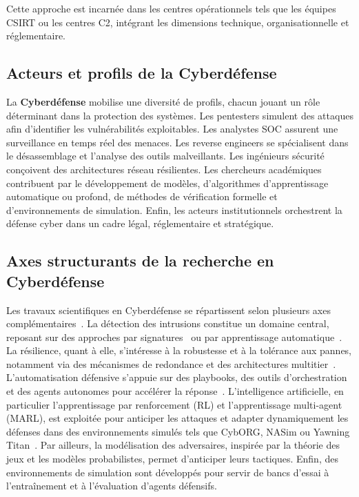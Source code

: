Cette approche est incarnée dans les centres opérationnels tels que les équipes \ac{CSIRT} ou les centres \ac{C2}, intégrant les dimensions technique, organisationnelle et réglementaire.

\subsection*{Acteurs et profils de la Cyberdéfense}

La \textbf{Cyberdéfense} mobilise une diversité de profils, chacun jouant un rôle déterminant dans la protection des systèmes. Les pentesters simulent des attaques afin d'identifier les vulnérabilités exploitables. Les analystes \ac{SOC} assurent une surveillance en temps réel des menaces. Les reverse engineers se spécialisent dans le désassemblage et l'analyse des outils malveillants. Les ingénieurs sécurité conçoivent des architectures réseau résilientes. Les chercheurs académiques contribuent par le développement de modèles, d'algorithmes d'apprentissage automatique ou profond, de méthodes de vérification formelle et d'environnements de simulation. Enfin, les acteurs institutionnels orchestrent la défense cyber dans un cadre légal, réglementaire et stratégique.


\subsection*{Axes structurants de la recherche en Cyberdéfense}

Les travaux scientifiques en Cyberdéfense se répartissent selon plusieurs axes complémentaires~\cite{Buczak2016}. La détection des intrusions constitue un domaine central, reposant sur des approches par signatures~\cite{Axelsson2000} ou par apprentissage automatique~\cite{Sommer2010,Buczak2016}. La résilience, quant à elle, s'intéresse à la robustesse et à la tolérance aux pannes, notamment via des mécanismes de redondance et des architectures multitier~\cite{Bodeau2011}. L'automatisation défensive s'appuie sur des playbooks, des outils d'orchestration et des agents autonomes pour accélérer la réponse~\cite{Hazra2022}. L'intelligence artificielle, en particulier l'apprentissage par renforcement (\ac{RL}) et l'apprentissage multi-agent (\ac{MARL}), est exploitée pour anticiper les attaques et adapter dynamiquement les défenses dans des environnements simulés tels que CybORG, NASim ou Yawning Titan~\cite{Standen2021, nasim2023,Andrew2022}. Par ailleurs, la modélisation des adversaires, inspirée par la théorie des jeux et les modèles probabilistes, permet d'anticiper leurs tactiques. Enfin, des environnements de simulation sont développés pour servir de bancs d'essai à l'entraînement et à l'évaluation d'agents défensifs.


